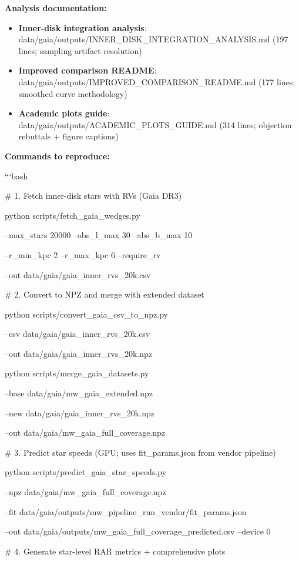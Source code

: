 \documentclass[11pt,a4paper]{article}
\begin{document}
\textbf{Analysis documentation:}

\begin{itemize}
\item \textbf{Inner-disk integration analysis}: data/gaia/outputs/INNER\_DISK\_INTEGRATION\_ANALYSIS.md (197 lines; sampling artifact resolution)
\item \textbf{Improved comparison README}: data/gaia/outputs/IMPROVED\_COMPARISON\_README.md (177 lines; smoothed curve methodology)
\item \textbf{Academic plots guide}: data/gaia/outputs/ACADEMIC\_PLOTS\_GUIDE.md (314 lines; objection rebuttals + figure captions)
\end{itemize}


\textbf{Commands to reproduce:}

```bash

\# 1. Fetch inner-disk stars with RVs (Gaia DR3)

python scripts/fetch\_gaia\_wedges.py \

  --max\_stars 20000 --abs\_l\_max 30 --abs\_b\_max 10 \

  --r\_min\_kpc 2 --r\_max\_kpc 6 --require\_rv \

  --out data/gaia/gaia\_inner\_rvs\_20k.csv


\# 2. Convert to NPZ and merge with extended dataset

python scripts/convert\_gaia\_csv\_to\_npz.py \

  --csv data/gaia/gaia\_inner\_rvs\_20k.csv \

  --out data/gaia/gaia\_inner\_rvs\_20k.npz


python scripts/merge\_gaia\_datasets.py \

  --base data/gaia/mw\_gaia\_extended.npz \

  --new data/gaia/gaia\_inner\_rvs\_20k.npz \

  --out data/gaia/mw\_gaia\_full\_coverage.npz


\# 3. Predict star speeds (GPU; uses fit\_params.json from vendor pipeline)

python scripts/predict\_gaia\_star\_speeds.py \

  --npz data/gaia/mw\_gaia\_full\_coverage.npz \

  --fit data/gaia/outputs/mw\_pipeline\_run\_vendor/fit\_params.json \

  --out data/gaia/outputs/mw\_gaia\_full\_coverage\_predicted.csv --device 0


\# 4. Generate star-level RAR metrics + comprehensive plots
\end{document}

